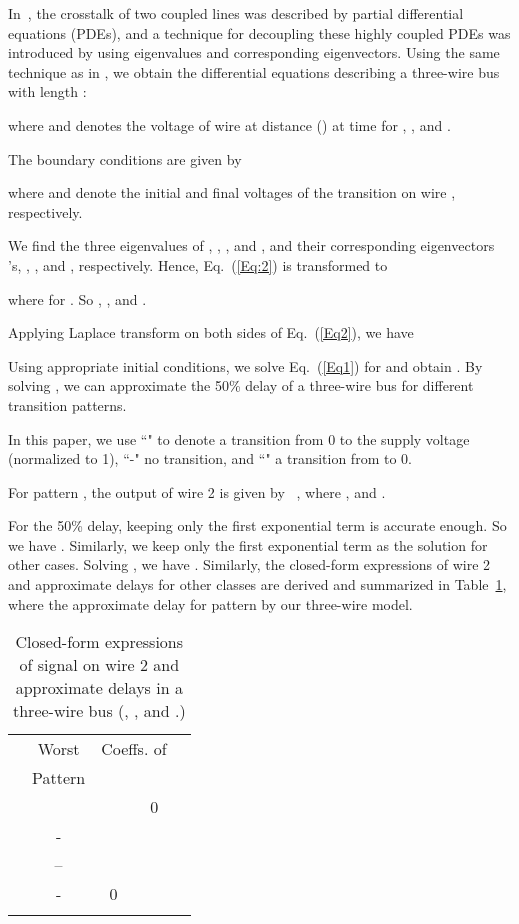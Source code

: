 \documentclass[10pt,journal]{IEEEtran}
\begin{document}
In~\cite{Sak93}, the crosstalk of two coupled lines was described by partial differential equations (PDEs), and a technique for decoupling these highly coupled PDEs was introduced by using eigenvalues and corresponding eigenvectors.
Using the same technique as in \cite{Sak93}, we obtain the differential equations describing a three-wire bus with length :

where  and  denotes the voltage of wire  at distance  () at time  for ,
, and .


The boundary conditions are given by

where  and  denote the initial and final voltages of the transition on wire , respectively.


We find the three eigenvalues of , , , and , and their corresponding eigenvectors 's, , , and , respectively. Hence, Eq.~(\ref{Eq:2}) is transformed to

where  for . So , , and .

Applying Laplace transform on both sides of Eq.~(\ref{Eq2}), we have


Using appropriate initial conditions, we solve Eq.~(\ref{Eq1}) for  and obtain .
By solving , we can approximate the 50\% delay of a three-wire bus for different transition patterns.


In this paper, we use ``" to denote a transition from 0 to the supply voltage  (normalized to 1), ``-" no transition, and ``" a transition from  to 0.

For  pattern , the output of wire 2 is given by~\cite{Sak93} , where , and .

For the 50\% delay, keeping only the first exponential term is accurate enough. So we have .
Similarly, we keep only the first exponential term as the solution for other cases.
Solving , we have .
Similarly, the closed-form expressions of wire 2 and approximate delays for other classes are derived and summarized in Table~\ref{tab:3wire}, where  the approximate delay for  pattern by our three-wire model.

\begin{table}[!thb]
\caption{Closed-form expressions of signal on wire 2 and approximate delays in a three-wire bus (, , and .)}\label{tab:3wire}
\begin{center}
\begin{tabular}{|c|c|c|c|c|}
\hline
\multirow{2}{*}{} & Worst & \multicolumn{2}{|c|}{Coeffs. of } & \multirow{2}{*}{}\\
\cline{3-4}
& Pattern &  &  & \\
\hline
 &  &  & 0 &  \\
\hline
 & - &  &  & \\
\hline
 & -- &  &  &  \\
\hline
 & - & 0 &  &  \\
\hline
 &  &  &  &  \\
\hline
\end{tabular}
\end{center}
\end{table}
\end{document}
